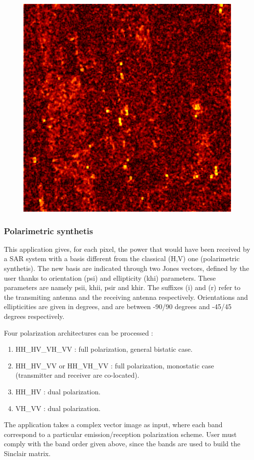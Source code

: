 \begin{center}
    \begin{figure}[h!]
    \includegraphics[width=\textwidth]{../Art/anisotropyhot.png}
    \label{fig:anisotropyimage}
   \end{figure}
   
\end{center}



\subsubsection{Polarimetric synthetis}

This application gives, for each pixel, the power that would have been received by a SAR system with a basis different from the classical (H,V) one (polarimetric synthetis). 
The new basis are indicated through two Jones vectors, defined by the user thanks to orientation (psi) and ellipticity (khi) parameters.
These parameters are namely psii, khii, psir and khir. The suffixes (i) and (r) refer to the transmiting antenna and the receiving antenna respectively.
Orientations and ellipticities are given in degrees, and are between -90/90 degrees and -45/45 degrees respectively. 

Four polarization architectures can be processed :
\begin{enumerate}
\item HH\_HV\_VH\_VV : full polarization, general bistatic case.
\item HH\_HV\_VV or HH\_VH\_VV : full polarization, monostatic case (transmitter and receiver are co-located).
\item HH\_HV : dual polarization.
\item VH\_VV : dual polarization.
\end{enumerate}
The application takes a complex vector image as input, where each band correspond to a particular emission/reception polarization scheme.
User must comply with the band order given above, since the bands are used to build the Sinclair matrix.

